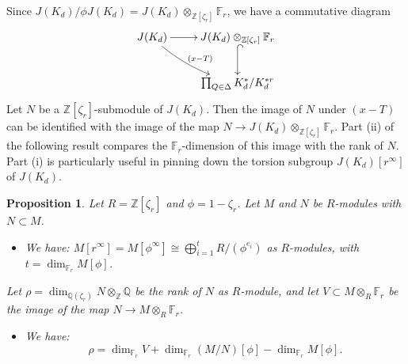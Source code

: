 \documentclass[reqno]{amsart}
\newtheorem{proposition}[thm]{Proposition}
\theoremstyle{definition}
\theoremstyle{remark}
\newcommand{\XminusT}{(x-T)}
\def\Q{\mathbb{Q}}
\def\Z{\mathbb{Z}}
\def\F{\mathbb{F}}
\begin{document}
Since $J(K_d)/\phi J(K_d) = J(K_d) \otimes_{\Z[\zeta_r]} \F_r$, we have a commutative diagram
\[
\xymatrix{
J(K_d) \ar@/_/[dr]^{\XminusT} \ar[r] &  J(K_d) \otimes_{\Z[\zeta_r]} \F_r \ar@{^(->}[d] \\\
& \prod_{Q \in \Delta} K_d^{\ast}/K_d^{\ast r}
}
\]
Let $N$ be a $\Z[\zeta_r]$-submodule of $J(K_d)$. Then the image of $N$ under $\XminusT$ can be identified with the image of the map $N \rightarrow J(K_d) \otimes_{\Z[\zeta_r]} \F_r$. Part (ii) of the following result compares the $\F_r$-dimension of this image with the rank of $N$. Part (i) is particularly useful in pinning down the torsion subgroup $J(K_d)[r^{\infty}]$ of $J(K_d)$.

\begin{proposition}
\label{theAlgebraPart}
Let $R = \Z[\zeta_r]$ and $\phi = 1-\zeta_r$. Let $M$ and $N$ be $R$-modules with $N \subset M$.  
\begin{itemize}\itemsep=0pt
\item[(i)] We have: $M[r^\infty] = M[\phi^\infty] \cong \bigoplus_{i=1}^t R/(\phi^{e_i})$ as $R$-modules, with $t = \dim_{\F_r} M[\phi]$.
\end{itemize}
Let $\rho = \dim_{\Q(\zeta_r)} N \otimes_{\Z} \Q$ be the rank of $N$ as $R$-module, and let $V \subset M \otimes_R \F_r$ be the image of the map $N \rightarrow M \otimes_R \F_r$.
\begin{itemize}\itemsep=0pt
\item[(ii)] We have:
$$
\rho = \dim_{\F_r} V + \dim_{\F_r} (M/N)[\phi] - \dim_{\F_r} M[\phi].
$$
\end{itemize}
\end{proposition}
\end{document}
